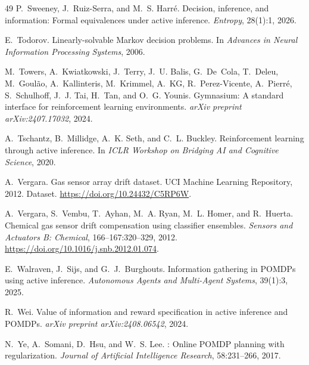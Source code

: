\documentclass[runningheads]{llncs}
\begin{document}
\begin{thebibliography}{49}
P.~Sweeney, J.~Ruiz-Serra, and M.~S. Harr\'{e}.
\newblock Decision, inference, and information: Formal equivalences under active inference.
\newblock \emph{Entropy}, 28(1):1, 2026.

E.~Todorov.
\newblock Linearly-solvable {M}arkov decision problems.
\newblock In \emph{Advances in Neural Information Processing Systems}, 2006.

M.~Towers, A.~Kwiatkowski, J.~Terry, J.~U. Balis, G.~De~Cola, T.~Deleu, M.~Goul{\~a}o, A.~Kallinteris, M.~Krimmel, A.~KG, R.~Perez-Vicente, A.~Pierr{\'e}, S.~Schulhoff, J.~J. Tai, H.~Tan, and O.~G. Younis.
\newblock Gymnasium: A standard interface for reinforcement learning environments.
\newblock \emph{arXiv preprint arXiv:2407.17032}, 2024.

A.~Tschantz, B.~Millidge, A.~K. Seth, and C.~L. Buckley.
\newblock Reinforcement learning through active inference.
\newblock In \emph{ICLR Workshop on Bridging AI and Cognitive Science}, 2020.

A.~Vergara.
\newblock Gas sensor array drift dataset.
\newblock UCI Machine Learning Repository, 2012. Dataset. \url{https://doi.org/10.24432/C5RP6W}.

A.~Vergara, S.~Vembu, T.~Ayhan, M.~A. Ryan, M.~L. Homer, and R.~Huerta.
\newblock Chemical gas sensor drift compensation using classifier ensembles.
\newblock \emph{Sensors and Actuators B: Chemical}, 166--167:320--329, 2012. \url{https://doi.org/10.1016/j.snb.2012.01.074}.

E.~Walraven, J.~Sijs, and G.~J.~Burghouts.
\newblock Information gathering in {POMDP}s using active inference.
\newblock \emph{Autonomous Agents and Multi-Agent Systems}, 39(1):3, 2025.

R.~Wei.
\newblock Value of information and reward specification in active inference and {POMDP}s.
\newblock \emph{arXiv preprint arXiv:2408.06542}, 2024.

N.~Ye, A.~Somani, D.~Hsu, and W.~S. Lee.
: Online {POMDP} planning with regularization.
\newblock \emph{Journal of Artificial Intelligence Research}, 58:231--266, 2017.

\end{thebibliography}
\end{document}
